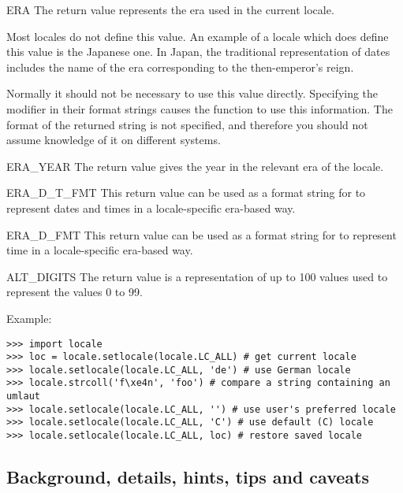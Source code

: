 \begin{datadesc}{ERA}
The return value represents the era used in the current locale.

Most locales do not define this value.  An example of a locale which
does define this value is the Japanese one.  In Japan, the traditional
representation of dates includes the name of the era corresponding to
the then-emperor's reign.

Normally it should not be necessary to use this value directly.
Specifying the  modifier in their format strings causes the
 function to use this information.  The format of the
returned string is not specified, and therefore you should not assume
knowledge of it on different systems.
\end{datadesc}

\begin{datadesc}{ERA_YEAR}
The return value gives the year in the relevant era of the locale.
\end{datadesc}

\begin{datadesc}{ERA_D_T_FMT}
This return value can be used as a format string for
 to represent dates and times in a locale-specific
era-based way.
\end{datadesc}

\begin{datadesc}{ERA_D_FMT}
This return value can be used as a format string for
 to represent time in a locale-specific era-based
way.
\end{datadesc}

\begin{datadesc}{ALT_DIGITS}
The return value is a representation of up to 100 values used to
represent the values 0 to 99.
\end{datadesc}

Example:

\begin{verbatim}
>>> import locale
>>> loc = locale.setlocale(locale.LC_ALL) # get current locale
>>> locale.setlocale(locale.LC_ALL, 'de') # use German locale
>>> locale.strcoll('f\xe4n', 'foo') # compare a string containing an umlaut 
>>> locale.setlocale(locale.LC_ALL, '') # use user's preferred locale
>>> locale.setlocale(locale.LC_ALL, 'C') # use default (C) locale
>>> locale.setlocale(locale.LC_ALL, loc) # restore saved locale
\end{verbatim}


\subsection{Background, details, hints, tips and caveats}

